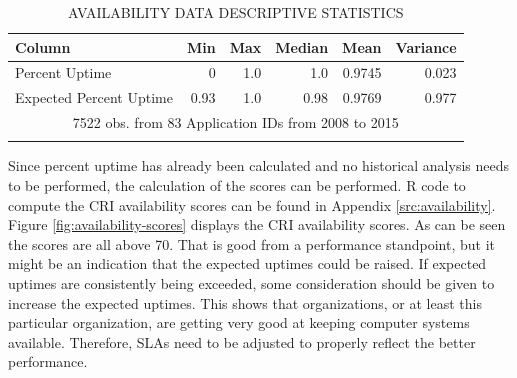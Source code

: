\documentclass[SDSUThesis.tex]{subfiles}
\begin{document}
            \begin{longtable}{@{}l rr rrr}
                \toprule%
                 \centering%
                 {\bfseries Column}
                 & {\bfseries Min}
                 & {\bfseries Max}
                 & {\bfseries Median}
                 & {\bfseries Mean}
                 & {\bfseries Variance} \\
                
                \cmidrule[0.2pt](r{0.125em}){1-1}%
                \cmidrule[0.2pt](lr{0.125em}){2-2}%
                \cmidrule[0.2pt](l{0.125em}){3-3}%
                \cmidrule[0.2pt](l{0.125em}){4-4}%
                \cmidrule[0.2pt](l{0.125em}){5-5}%
                \endhead
                
                Percent Uptime & 0 & 1.0 & 1.0 & 0.9745 & 0.023 \\
                \myrowcolour%
                Expected Percent Uptime & 0.93 & 1.0 & 0.98 & 0.9769  & 0.977\\
                
                \bottomrule
                
                \multicolumn{6}{c}{7522 obs. from 83 Application IDs from 2008 to 2015} \\
                
                \caption{AVAILABILITY DATA DESCRIPTIVE STATISTICS}
                \label{tab:availability_desc}
            \end{longtable}
            
            Since percent uptime has already been calculated and no historical
            analysis needs to be performed, the calculation of the scores
            can be performed. 
            R code to compute the CRI availability scores can be found in Appendix
            \ref{src:availability}. Figure \ref{fig:availability-scores} displays
            the CRI availability scores.  As can be seen the scores are all above
            70.  That is good from a performance standpoint, but it might be an
            indication that the expected uptimes could be raised.  If expected
            uptimes are consistently being exceeded, some consideration should
            be given to increase the expected uptimes.  This shows that
            organizations, or at least this particular organization, are getting
            very good at keeping computer systems available.  Therefore,
            SLAs need to be adjusted to properly reflect the better performance.
            
\end{document}

